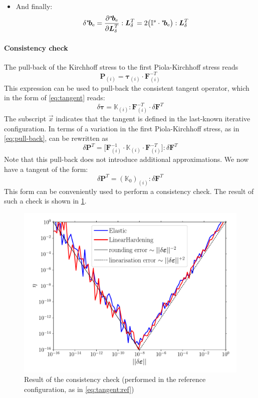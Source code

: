 \documentclass{goose-article}
\newcommand\ST[1]{\hspace*{-.3em}~^\star\!#1}
\newcommand\T[1]{\bm{{#1}}}
\newcommand\TT[1]{\mathbb{{#1}}}
\begin{document}
\begin{itemize}
    \item And finally:
    \begin{equation}
        \delta \ST{\T{b}}_\mathrm{e}
        = \frac{\partial \ST{\T{b}}_\mathrm{e}}{\partial \T{L}_\delta^T} : \T{L}_\delta^T
        = 2 \big( \TT{I}^s \cdot \ST{\T{b}}_\mathrm{e} \big) : \T{L}_\delta^T
    \end{equation}

\end{itemize}


\paragraph{Consistency check}

The pull-back of the Kirchhoff stress to the first Piola-Kirchhoff stress reads
\begin{equation}
    \T{P}_{(i)} = \bm{\tau}_{(i)} \cdot \T{F}^{-T}_{(i)}
\end{equation}
This expression can be used to pull-back the consistent tangent operator,
which in the form of \cref{eq:tangent} reads:
\begin{equation}
    \delta \bm{\tau}
    =
    \TT{K}_{(i)}
    : \T{F}_{(i)}^{-T} \cdot \delta \T{F}^T
    \label{eq:pull-back}
\end{equation}
%
The subscript $\vec{x}$ indicates that the tangent is defined
in the last-known iterative configuration.
In terms of a variation in the first Piola-Kirchhoff stress,
as in \cref{eq:pull-back}, can be rewritten as
%
\begin{equation}
    \delta \T{P}^T
    =
    \big[
    \T{F}_{(i)}^{-1} \cdot
    \TT{K}_{(i)}
    \cdot \T{F}_{(i)}^{-T}
    \big]
    : \delta \T{F}^T
\end{equation}
%
Note that this pull-back does not introduce additional approximations.
We now have a tangent of the form:
\begin{equation}
    \delta \T{P}^T = (\TT{K}_0)_{(i)} : \delta \T{F}^T
    \label{eq:tangent:ref}
\end{equation}
This form can be conveniently used to perform a consistency check.
The result of such a check is shown in \cref{fig:consistency}.

\begin{figure}[htp]
    \centering
    \includegraphics[width=.5\textwidth]{examples/consistency}
    \caption{
        Result of the consistency check
        (performed in the reference configuration, as in \cref{eq:tangent:ref})}
    \label{fig:consistency}
\end{figure}


\end{document}
